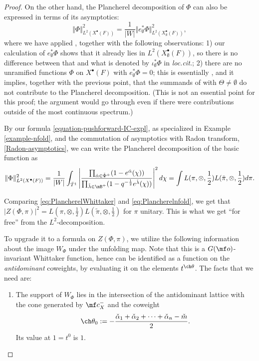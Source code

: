 \documentclass[final]{amsart}
\theoremstyle{remark}
\theoremstyle{definition}
\numberwithin{equation}{section}
\begin{document}
\begin{proof}
 On the other hand, the Plancherel decomposition of $\Phi$ can also be expressed in terms of its asymptotics:
 \[ \Vert \Phi\Vert^2_{L^2(X^\bullet(F))} = \frac{1}{|W|} \Vert e_\emptyset^* \Phi\Vert^2_{L^2(X_\emptyset^\bullet(F))},
 \]
 where we have applied \cite[Theorem 7.3.1]{SV}, together with the following observations: 1) our calculation of $e_\emptyset^* \Phi$ shows that it already lies in $L^2(X_\emptyset^\bullet(F))$, so there is no difference between that and what is denoted by $\iota_\emptyset^* \Phi$ in \emph{loc.cit.}; 2) there are no unramified functions $\Phi$ on $X^\bullet(F)$ with $e_\emptyset^*\Phi = 0$; this is essentially \cite[Theorem 6.2.1]{SaSpc}, and it implies, together with the previous point, that the summands of \cite[Theorem 7.3.1]{SV} with $\Theta\ne \emptyset$ do not contribute to the Plancherel decomposition. (This is not an essential point for this proof; the argument would go through even if there were contributions outside of the most continuous spectrum.)

 
By our formula \eqref{equation-pushforward-IC-expl}, as specialized in Example \ref{example-nfold}, and the commutation of asymptotics with Radon transform, \eqref{Radon-asymptotics}, we can write the Plancherel decomposition of the basic function as 
 \begin{equation}\label{eq:Plancherelnfold} \Vert \Phi\Vert^2_{L^2(X^\bullet(F))} = \frac{1}{|W|} \int_{\check T^1} 
\left|\frac{\prod_{\check\alpha\in\check\Phi^+} (1-e^{\check\alpha}(\chi))}{\prod_{\check\lambda \in \mB^+} (1-q^{-\frac{1}{2}} e^{\check\lambda}(\chi))}\right|^2 d\chi =   
 \int L(\pi, \otimes, \frac{1}{2}) L(\tilde \pi, \otimes, \frac{1}{2})
 d\pi.
 \end{equation}
 
Comparing \eqref{eq:PlancherelWhittaker} and \eqref{eq:Plancherelnfold}, we get that $|Z(\Phi, \pi)|^2 = L(\pi, \otimes, \frac{1}{2}) L(\tilde\pi, \otimes, \frac{1}{2})$ for $\pi$ unitary. This is what we get ``for free'' from the $L^2$-decomposition.
 
To upgrade it to a formula on $Z(\Phi, \pi)$, we utilize the following information about the image $W_{\Phi}$ under the unfolding map. Note that this is a $G(\mf o)$-invariant Whittaker function, hence can be identified as a function on the \emph{antidominant} coweights, by evaluating it on the elements $t^{\ch\theta}$. The facts that we need are:

\begin{enumerate}
 \item The support of $W_{\Phi}$ lies in the intersection of the antidominant lattice with the cone generated by $\mf c_X^-$ and the coweight \[\ch\theta_0:= - \frac{\check\alpha_1+\check\alpha_2+\dots+\check\alpha_n - \check m}{2}.\]
 Its value at $1 = t^0$ is $1$.
 

\end{enumerate}
\end{proof}
\end{document}
